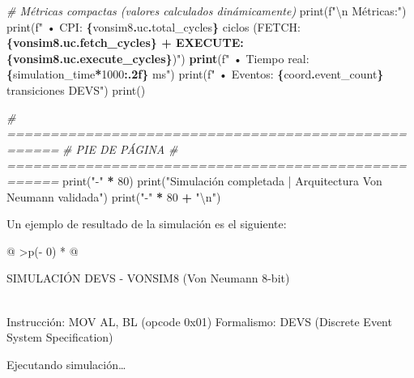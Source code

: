 \documentclass[12pt,oneside]{templates/unerthesis}
\newenvironment{Shaded}{\begin{snugshade}}{\end{snugshade}}
\newcommand{\BuiltInTok}[1]{#1}
\newcommand{\CharTok}[1]{\textcolor[rgb]{0.31,0.60,0.02}{#1}}
\newcommand{\CommentTok}[1]{\textcolor[rgb]{0.56,0.35,0.01}{\textit{#1}}}
\newcommand{\DecValTok}[1]{\textcolor[rgb]{0.00,0.00,0.81}{#1}}
\newcommand{\ErrorTok}[1]{\textcolor[rgb]{0.64,0.00,0.00}{\textbf{#1}}}
\newcommand{\NormalTok}[1]{#1}
\newcommand{\OperatorTok}[1]{\textcolor[rgb]{0.81,0.36,0.00}{\textbf{#1}}}
\newcommand{\SpecialCharTok}[1]{\textcolor[rgb]{0.81,0.36,0.00}{\textbf{#1}}}
\newcommand{\SpecialStringTok}[1]{\textcolor[rgb]{0.31,0.60,0.02}{#1}}
\newcommand{\StringTok}[1]{\textcolor[rgb]{0.31,0.60,0.02}{#1}}
\begin{document}
\begin{Shaded}
\begin{Highlighting}[]
    \CommentTok{\# Métricas compactas (valores calculados dinámicamente)}
    \BuiltInTok{print}\NormalTok{(}\SpecialStringTok{f"}\CharTok{\textbackslash{}n}\SpecialStringTok{  Métricas:"}\NormalTok{)}
    \BuiltInTok{print}\NormalTok{(}\SpecialStringTok{f" • CPI:         }\SpecialCharTok{\{}\NormalTok{vonsim8}\SpecialCharTok{.}\NormalTok{uc}\SpecialCharTok{.}\NormalTok{total\_cycles}\SpecialCharTok{\}}\SpecialStringTok{ ciclos (FETCH:}
\ErrorTok{    \{vonsim8.uc.fetch\_cycles\} + EXECUTE: \{vonsim8.uc.execute\_cycles\}}\NormalTok{)}\StringTok{")}
\ErrorTok{    print}\NormalTok{(}\SpecialStringTok{f" • Tiempo real: }\SpecialCharTok{\{}\NormalTok{simulation\_time}\OperatorTok{*}\DecValTok{1000}\SpecialCharTok{:.2f\}}\SpecialStringTok{ ms"}\NormalTok{)}
    \BuiltInTok{print}\NormalTok{(}\SpecialStringTok{f" • Eventos:     }\SpecialCharTok{\{}\NormalTok{coord}\SpecialCharTok{.}\NormalTok{event\_count}\SpecialCharTok{\}}\SpecialStringTok{ transiciones DEVS"}\NormalTok{)}
    \BuiltInTok{print}\NormalTok{()}
    
    \CommentTok{\# ====================================================}
    \CommentTok{\# PIE DE PÁGINA}
    \CommentTok{\# ====================================================}
    \BuiltInTok{print}\NormalTok{(}\StringTok{"{-}"} \OperatorTok{*} \DecValTok{80}\NormalTok{)}
    \BuiltInTok{print}\NormalTok{(}\StringTok{"Simulación completada | Arquitectura Von Neumann validada"}\NormalTok{)}
    \BuiltInTok{print}\NormalTok{(}\StringTok{"{-}"} \OperatorTok{*} \DecValTok{80} \OperatorTok{+} \StringTok{"}\CharTok{\textbackslash{}n}\StringTok{"}\NormalTok{)}
\end{Highlighting}
\end{Shaded}

Un ejemplo de resultado de la simulación es el siguiente:

\begin{longtable}[]{@{}
  >{\centering\arraybackslash}p{(\columnwidth - 0\tabcolsep) * }@{}}
\toprule\noalign{}
\begin{minipage}[b]{\linewidth}\centering
SIMULACIÓN DEVS - VONSIM8 (Von Neumann 8-bit)
\end{minipage} \\
\midrule\noalign{}
\endhead
\bottomrule\noalign{}
\endlastfoot
Instrucción: MOV AL, BL (opcode 0x01)
Formalismo: DEVS (Discrete Event System Specification) \\
\end{longtable}

Ejecutando simulación\ldots{}
\end{document}
